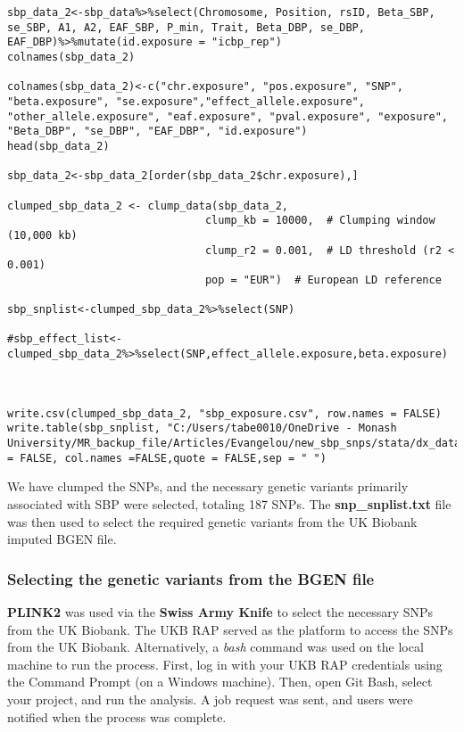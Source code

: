 \documentclass[11pt]{article}
\begin{document}
\begin{lstlisting}[style=Rstyle]
sbp_data_2<-sbp_data%>%select(Chromosome, Position, rsID, Beta_SBP, se_SBP, A1, A2, EAF_SBP, P_min, Trait, Beta_DBP, se_DBP, EAF_DBP)%>%mutate(id.exposure = "icbp_rep")
colnames(sbp_data_2)

colnames(sbp_data_2)<-c("chr.exposure", "pos.exposure", "SNP", "beta.exposure", "se.exposure","effect_allele.exposure", "other_allele.exposure", "eaf.exposure", "pval.exposure", "exposure", "Beta_DBP", "se_DBP", "EAF_DBP", "id.exposure")
head(sbp_data_2)

sbp_data_2<-sbp_data_2[order(sbp_data_2$chr.exposure),]

clumped_sbp_data_2 <- clump_data(sbp_data_2, 
                               clump_kb = 10000,  # Clumping window (10,000 kb)
                               clump_r2 = 0.001,  # LD threshold (r2 < 0.001)
                               pop = "EUR")  # European LD reference

sbp_snplist<-clumped_sbp_data_2%>%select(SNP)

#sbp_effect_list<-clumped_sbp_data_2%>%select(SNP,effect_allele.exposure,beta.exposure)



write.csv(clumped_sbp_data_2, "sbp_exposure.csv", row.names = FALSE)
write.table(sbp_snplist, "C:/Users/tabe0010/OneDrive - Monash University/MR_backup_file/Articles/Evangelou/new_sbp_snps/stata/dx_data/sbp/data/sbp_snplist.txt",row.names = FALSE, col.names =FALSE,quote = FALSE,sep = " ")

\end{lstlisting}
\color{black}
We have clumped the SNPs, and the necessary genetic variants primarily associated with SBP were selected, totaling 187 SNPs. The \textbf{snp\_snplist.txt} file was then used to select the required genetic variants from the UK Biobank imputed BGEN file.

\subsubsection{Selecting the genetic variants from the BGEN file}

\textbf{PLINK2} was used via the \textbf{Swiss Army Knife} to select the necessary SNPs from the UK Biobank. The UKB RAP served as the platform to access the SNPs from the UK Biobank. Alternatively, a \textit{bash} command was used on the local machine to run the process. First, log in with your UKB RAP credentials using the Command Prompt (on a Windows machine). Then, open Git Bash, select your project, and run the analysis. A job request was sent, and users were notified when the process was complete.
\end{document}
